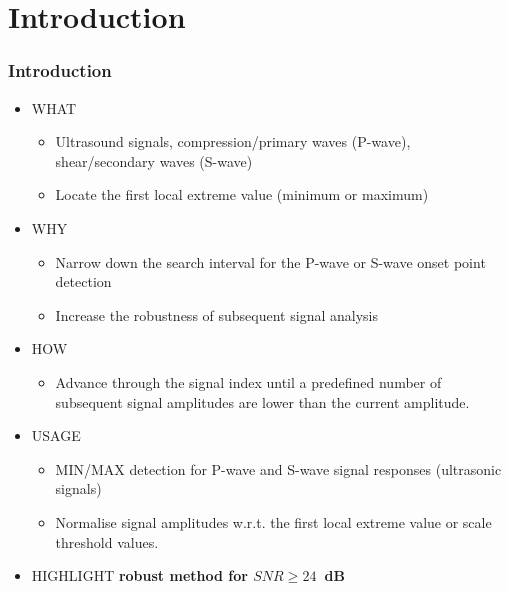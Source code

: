 \documentclass[11pt,aspectratio=169]{beamer}
\begin{document}
	\section{Introduction}
	\begin{frame}
		\frametitle{Introduction}
		\begin{itemize}
			\item \textcolor{RIPtitlecol}{WHAT}
			\begin{itemize}
				\item Ultrasound signals, compression/primary waves (P-wave), shear/secondary waves (S-wave)
				\item Locate the first local extreme value (minimum or maximum)
			\end{itemize}
			\item \textcolor{RIPtitlecol}{WHY}
			\begin{itemize}
				\item Narrow down the search interval for the P-wave or S-wave onset point detection
				\item Increase the robustness of subsequent signal analysis
			\end{itemize}
			\item \textcolor{RIPtitlecol}{HOW}
			\begin{itemize}
				\item Advance through the signal index until a predefined number of subsequent signal amplitudes are lower than the current amplitude.
			\end{itemize}
			\item \textcolor{RIPtitlecol}{USAGE}
				\begin{itemize}
					\item MIN/MAX detection for P-wave and S-wave signal responses (ultrasonic signals)
					\item Normalise signal amplitudes w.r.t. the first local extreme value or scale threshold values.
				\end{itemize}
			\item \textcolor{RIPtitlecol}{HIGHLIGHT} \textbf{robust method for $SNR \geq 24$~dB}
		\end{itemize}
	\end{frame}
\end{document}
